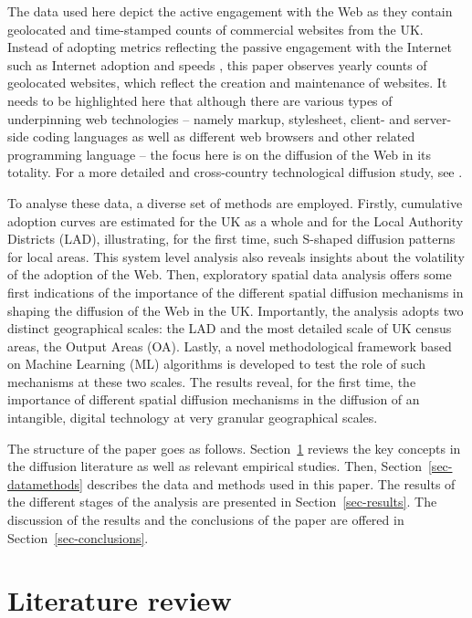 \documentclass[
  authoryear,
  preprint,
  3p]{elsarticle}
\begin{document}
The data used here depict the active engagement with the Web as they
contain geolocated and time-stamped counts of commercial websites from
the UK. Instead of adopting metrics reflecting the passive engagement
with the Internet such as Internet adoption and speeds
\citep[e.g.][]{blank2018local, destefano2022fuzzy}, this paper observes
yearly counts of geolocated websites, which reflect the creation and
maintenance of websites. It needs to be highlighted here that although
there are various types of underpinning web technologies -- namely
markup, stylesheet, client- and server-side coding languages as well as
different web browsers and other related programming language -- the
focus here is on the diffusion of the Web in its totality. For a more
detailed and cross-country technological diffusion study, see
\citet{PAPAGIANNIDIS2015308}.

To analyse these data, a diverse set of methods are employed. Firstly,
cumulative adoption curves are estimated for the UK as a whole and for
the Local Authority Districts (LAD), illustrating, for the first time,
such S-shaped diffusion patterns for local areas. This system level
analysis also reveals insights about the volatility of the adoption of
the Web. Then, exploratory spatial data analysis offers some first
indications of the importance of the different spatial diffusion
mechanisms in shaping the diffusion of the Web in the UK. Importantly,
the analysis adopts two distinct geographical scales: the LAD and the
most detailed scale of UK census areas, the Output Areas (OA). Lastly, a
novel methodological framework based on Machine Learning (ML) algorithms
is developed to test the role of such mechanisms at these two scales.
The results reveal, for the first time, the importance of different
spatial diffusion mechanisms in the diffusion of an intangible, digital
technology at very granular geographical scales.

The structure of the paper goes as follows. Section~\ref{sec-litreview}
reviews the key concepts in the diffusion literature as well as relevant
empirical studies. Then, Section~\ref{sec-datamethods} describes the
data and methods used in this paper. The results of the different stages
of the analysis are presented in Section~\ref{sec-results}. The
discussion of the results and the conclusions of the paper are offered
in Section~\ref{sec-conclusions}.

\section{Literature review}\label{sec-litreview}
\end{document}
